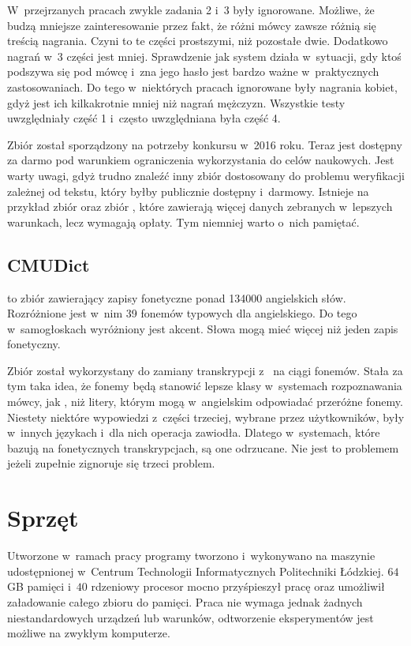 W~przejrzanych pracach zwykle zadania 2 i~3 były ignorowane. Możliwe, że budzą mniejsze zainteresowanie przez fakt,
że różni mówcy zawsze różnią się treścią nagrania. Czyni to te części prostszymi, niż pozostałe dwie.
Dodatkowo nagrań w~3 części jest mniej.
Sprawdzenie jak system działa w~sytuacji, gdy ktoś podszywa się pod mówcę i~zna jego hasło jest bardzo
ważne w~praktycznych zastosowaniach.  Do tego w~niektórych pracach ignorowane
były nagrania kobiet, gdyż jest ich kilkakrotnie mniej niż nagrań mężczyzn.
Wszystkie testy uwzględniały część 1 i~często uwzględniana była część 4.

Zbiór został sporządzony na potrzeby konkursu w~2016 roku. Teraz jest dostępny za darmo pod warunkiem
ograniczenia wykorzystania do celów naukowych. Jest warty uwagi, gdyż trudno znaleźć inny
zbiór dostosowany do problemu weryfikacji zależnej od tekstu, który byłby publicznie dostępny i~darmowy.
Istnieje na przykład zbiór  oraz zbiór , które
zawierają więcej danych zebranych w~lepszych warunkach, lecz wymagają opłaty. Tym niemniej warto
o~nich pamiętać.

\subsection{CMUDict}

\cite{TheCMUPronouncing} to zbiór zawierający zapisy fonetyczne ponad 134000 angielskich słów.
Rozróżnione jest w~nim 39 fonemów typowych dla angielskiego. Do tego w~samogłoskach wyróżniony jest akcent.
Słowa mogą mieć więcej niż jeden zapis fonetyczny.

Zbiór został wykorzystany do zamiany transkrypcji z~ na ciągi fonemów. Stała
za tym taka idea, że fonemy będą stanowić lepsze klasy w~systemach rozpoznawania mówcy, jak
, niż litery, którym mogą w~angielskim odpowiadać przeróżne fonemy.
Niestety niektóre wypowiedzi z~części trzeciej, wybrane przez użytkowników, były w~innych językach
i~dla nich operacja zawiodła. Dlatego w~systemach, które bazują na fonetycznych transkrypcjach,
są one odrzucane. Nie jest to problemem jeżeli zupełnie zignoruje się trzeci problem.

\section{Sprzęt}\label{sec:sprzet}

Utworzone w~ramach pracy programy tworzono i~wykonywano na maszynie udostępnionej
w~Centrum Technologii Informatycznych Politechniki Łódzkiej. $64$GB pamięci i~$40$ rdzeniowy
procesor mocno przyśpieszył pracę oraz umożliwił załadowanie całego zbioru do pamięci.
Praca nie wymaga jednak żadnych niestandardowych urządzeń lub warunków, odtworzenie eksperymentów
jest możliwe na zwykłym komputerze.

